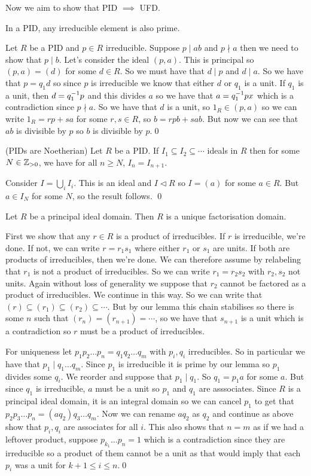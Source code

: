 \documentclass{article}
\newcommand{\nrm}{\triangleleft}
\begin{document}
Now we aim to show that PID $ \implies $ UFD.
\begin{lemma}
  In a PID, any irreducible element is also prime.
\end{lemma}
\pf Let $ R $ be a PID and $ p\in R $ irreducible. Suppose $ p\mid ab $ and $ p\nmid a $ then we need to show that $ p\mid b $. Let's consider the ideal $ (p, a) $. This is principal so $ (p,a)=(d) $ for some $ d\in R $. So we must have that $ d\mid p $ and $ d\mid a $. So we have that $ p=q_1d $ so since $ p $ is irreducible we know that either $ d $ or $ q_1 $ is a unit. If $ q_1 $ is a unit, then $ d={q}^{-1}_1 p $ and this divides $ a $ so we have that $ a={q}^{-1}_1px $ which is a contradiction since $ p\nmid a $. So we have that $ d $ is a unit, so $ 1_R\in (p,a) $ so we can write $ 1_R=rp+sa $ for some $ r,s\in R $, so $ b=rpb+sab $. But now we can see that $ ab $ is divisible by $ p $ so $ b $ is divisible by $ p $.\qed
\begin{lemma}
	(PIDs are Noetherian) Let $ R $ be a PID. If $ I_1\subseteq I_2\subseteq\cdots $ ideals in $ R $ then for some $ N\in \mathbb{Z}_{> 0} $, we have for all $ n\ge N $, $ I_n=I_{n+1} $.
\end{lemma}
\pf Consider $ I=\bigcup_iI_i $. This is an ideal and $ I\nrm R $ so $ I=(a) $ for some $ a\in R $. But $ a\in I_N $ for some $ N $, so the result follows. \qed
\begin{theorem}
  Let $ R $ be a principal ideal domain. Then $ R $ is a unique factorisation domain.
\end{theorem}
\pf First we show that any $ r\in R $ is a product of irreducibles. If $ r $ is irreducible, we're done. If not, we can write $ r=r_1s_1 $ where either $ r_1 $ or $ s_1 $ are units. If both are products of irreducibles, then we're done. We can therefore assume by relabeling that $ r_1 $ is not a product of irreducibles. So we can write $ r_1=r_2s_2 $ with $ r_2,s_2 $ not units. Again without loss of generality we suppose that $ r_2 $ cannot be factored as a product of irreducibles. We continue in this way. So we can write that $ (r)\subseteq (r_1)\subseteq (r_2)\subseteq\cdots $. But by our lemma this chain stabilises so there is some $ n $ such that $ (r_n)=(r_{n+1})=\cdots $, so we have that $ s_{n+1} $ is a unit which is a contradiction so $ r $ must be a product of irreducibles.\par
For uniqueness let $ p_1p_2\dots p_n=q_1q_2\dots q_m $ with $ p_i,q_i $ irreducibles. So in particular we have that $ p_1\mid q_1\dots q_m $. Since $ p_1 $ is irreducible it is prime by our lemma so $ p_1 $ divides some $ q_i $. We reorder and suppose that $ p_1\mid q_1 $. So $ q_1=p_1a $ for some $ a $. But since $ q_1 $ is irreducible, $ a $ must be a unit so $ p_1 $ and $ q_1 $ are asssociates. Since $ R $ is a principal ideal domain, it is an integral domain so we can cancel $ p_1 $ to get that $ p_2p_3\dots p_n=(aq_2)q_3\dots q_m $. Now we can rename $ aq_2 $ as $ q_2 $ and continue as above show that $ p_i, q_i $ are associates for all $ i $. This also shows that $ n=m $ as if we had a leftover product, suppose $ p_{k_1}\dots p_n = 1$ which is a contradiction since they are irreducible so a product of them cannot be a unit as that would imply that each $ p_i $ was a unit for $ k+1\le i \le n $.\qed
\end{document}
